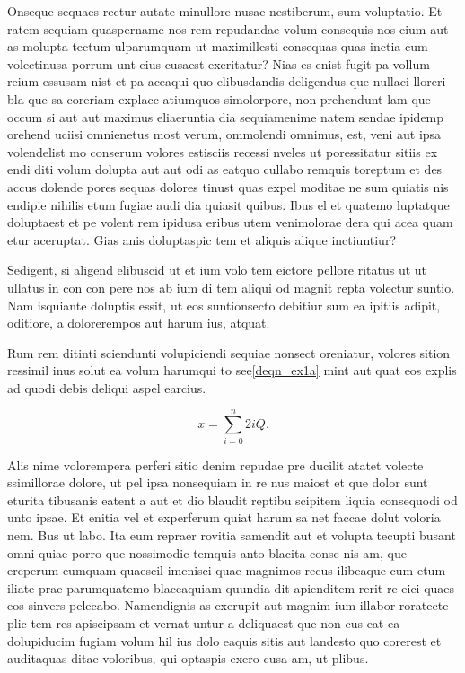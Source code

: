 \documentclass[lettersize,journal]{IEEEtran}
\begin{document}
Onseque sequaes rectur autate minullore nusae nestiberum, sum voluptatio. Et ratem sequiam quaspername nos rem repudandae volum consequis nos eium aut as molupta tectum ulparumquam ut maximillesti consequas quas inctia cum volectinusa porrum unt eius cusaest exeritatur? Nias es enist fugit pa vollum reium essusam nist et pa aceaqui quo elibusdandis deligendus que nullaci lloreri bla que sa coreriam explacc atiumquos simolorpore, non prehendunt lam que occum\cite{ref6} si aut aut maximus eliaeruntia dia sequiamenime natem sendae ipidemp orehend uciisi omnienetus most verum, ommolendi omnimus, est, veni aut ipsa volendelist mo conserum volores estisciis recessi nveles ut poressitatur sitiis ex endi diti volum dolupta aut aut odi as eatquo cullabo remquis toreptum et des accus dolende pores sequas dolores tinust quas expel moditae ne sum quiatis nis endipie nihilis etum fugiae audi dia quiasit quibus.
\IEEEpubidadjcol
Ibus el et quatemo luptatque doluptaest et pe volent rem ipidusa eribus utem venimolorae dera qui acea quam etur aceruptat.
Gias anis doluptaspic tem et aliquis alique inctiuntiur?

Sedigent, si aligend elibuscid ut et ium volo tem eictore pellore ritatus ut ut ullatus in con con pere nos ab ium di tem aliqui od magnit repta volectur suntio. Nam isquiante doluptis essit, ut eos suntionsecto debitiur sum ea ipitiis adipit, oditiore, a dolorerempos aut harum ius, atquat.

Rum rem ditinti sciendunti volupiciendi sequiae nonsect oreniatur, volores sition ressimil inus solut ea volum harumqui to see\eqref{deqn_ex1a} mint aut quat eos explis ad quodi debis deliqui aspel earcius.

\begin{equation}
\label{deqn_ex1a}
x = \sum_{i=0}^{n} 2{i} Q.
\end{equation}

Alis nime volorempera perferi sitio denim repudae pre ducilit atatet volecte ssimillorae dolore, ut pel ipsa nonsequiam in re nus maiost et que dolor sunt eturita tibusanis eatent a aut et dio blaudit reptibu scipitem liquia consequodi od unto ipsae. Et enitia vel et experferum quiat harum sa net faccae dolut voloria nem. Bus ut labo. Ita eum repraer rovitia samendit aut et volupta tecupti busant omni quiae porro que nossimodic temquis anto blacita conse nis am, que ereperum eumquam quaescil imenisci quae magnimos recus ilibeaque cum etum iliate prae parumquatemo blaceaquiam quundia dit apienditem rerit re eici quaes eos sinvers pelecabo. Namendignis as exerupit aut magnim ium illabor roratecte plic tem res apiscipsam et vernat untur a deliquaest que non cus eat ea dolupiducim fugiam volum hil ius dolo eaquis sitis aut landesto quo corerest et auditaquas ditae voloribus, qui optaspis exero cusa am, ut plibus.
\end{document}
